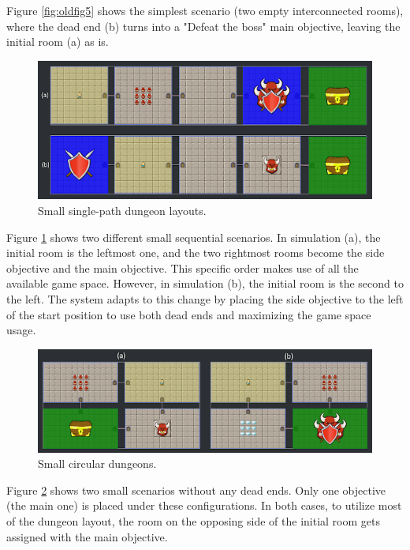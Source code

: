 Figure \ref{fig:oldfig5} shows the simplest scenario (two empty interconnected rooms), where the dead end (b) turns into a "Defeat the boss" main objective, leaving the initial room (a) as is. 

\begin{figure}[h]
  \centering
  \includegraphics[width=\columnwidth]{included-papers-tex/paper-7/figures/results2.png}
  \caption{Small single-path dungeon layouts.}
  \label{fig:oldfig6}
\end{figure}


Figure \ref{fig:oldfig6} shows two different small sequential scenarios. In simulation (a), the initial room is the leftmost one, and the two rightmost rooms become the side objective and the main objective. This specific order makes use of all the available game space. However, in simulation (b), the initial room is the second to the left. The system adapts to this change by placing the side objective to the left of the start position to use both dead ends and maximizing the game space usage. %

\begin{figure}[h]
  \centering
  \includegraphics[width=\columnwidth]{included-papers-tex/paper-7/figures/results3.png}
  \caption{Small circular dungeons.}
  \label{fig:oldfig7}
\end{figure}

Figure \ref{fig:oldfig7} shows two small scenarios without any dead ends. Only one objective (the main one) is placed under these configurations. In both cases, to utilize most of the dungeon layout, the room on the opposing side of the initial room gets assigned with the main objective.

